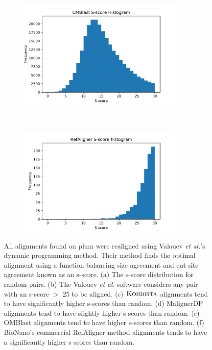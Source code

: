 \begin{figure}[h!t]
\begin{subfigure}[b]{0.5\textwidth}
\includegraphics[width=0.9\textwidth]{gcsa_paper/content/figures/shist_omblast.pdf}
\end{subfigure}~\begin{subfigure}[b]{0.5\textwidth}
\includegraphics[width=0.9\textwidth]{gcsa_paper/content/figures/shist_refaligner.pdf}
\end{subfigure}
  \caption{All alignments found on plum were realigned using Valouev {\it et al.}'s dynamic programming method.  Their method finds the optimal alignment using a function balancing size agreement and cut site agreement known as an s-score. (a)  The s-score distribution for random pairs. (b) The Valouev {\it et al.} software considers any pair with an s-score $>$ 25 to be aligned. (c) $\mbox{\rm \textsc{Kohdista}}$  alignments tend to have significantly higher s-scores than random. (d) MalignerDP alignments tend to have slightly higher s-scores than random.  (e) OMBlast alignments tend to have higher s-scores than random. (f) BioNano's commercial RefAligner method  alignments tends to have a significantly higher s-scores than random.}


\label{fig:shist}
\end{figure}

